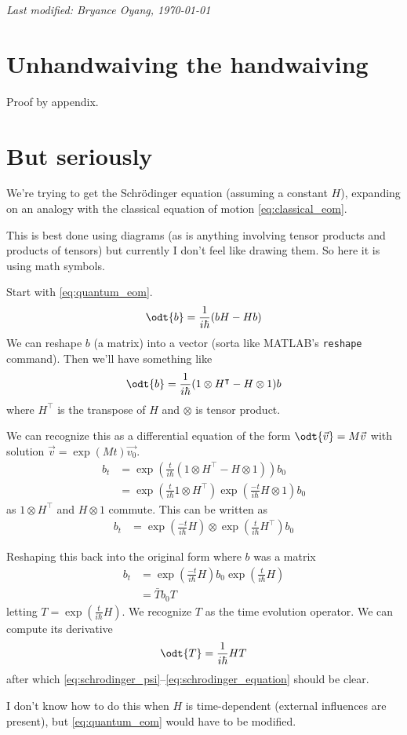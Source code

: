 \documentclass[12pt, oneside, letterpaper, fleqn]{article}
\begin{document}
\hfill \emph{Last modified: Bryance Oyang, \today}

\begin{appendices}
\section{Unhandwaiving the handwaiving}\label{app:complicated}
Proof by appendix.

\section{But seriously}
We're trying to get the Schr\"odinger equation (assuming a constant
$H$), expanding on an analogy with the classical equation of motion
\eqref{eq:classical_eom}.

This is best done using diagrams (as is anything involving tensor
products and products of tensors) but currently I don't feel like
drawing them. So here it is using math symbols.

Start with \eqref{eq:quantum_eom}.
\begin{align*}
\odt{b} = \frac{1}{i\hbar}(bH - Hb)
\end{align*}
We can reshape $b$ (a matrix) into a vector (sorta like MATLAB's
\texttt{reshape} command). Then we'll have something like
\begin{align*}
\odt{b} = \frac{1}{i\hbar}(1\otimes H^\intercal - H\otimes 1)b
\end{align*}
where $H^\intercal$ is the transpose of $H$ and $\otimes$ is tensor product.

We can recognize this as a differential equation of the form
$\odt{\vec{v}} = M\vec{v}$ with solution $\vec{v} = \exp(Mt)\vec{v_0}$.
\begin{align*}
b_t &= \exp\left(\frac{t}{i\hbar}(1\otimes H^\intercal - H\otimes 1)\right)b_0\\
&= \exp\left(\frac{t}{i\hbar}1\otimes H^\intercal\right)
\exp\left(\frac{-t}{i\hbar}H\otimes 1\right)b_0
\end{align*}
as $1\otimes H^\intercal$ and $H\otimes 1$ commute. This can be written as
\begin{align*}
b_t &= \exp\left(\frac{-t}{i\hbar}H\right)
\otimes\exp\left(\frac{t}{i\hbar}H^\intercal\right)b_0
\end{align*}

Reshaping this back into the original form where $b$ was a matrix
\begin{align*}
b_t &= \exp\left(\frac{-t}{i\hbar}H\right) b_0
\exp\left(\frac{t}{i\hbar}H\right)\\
&= \bar{T} b_0 T
\end{align*}
letting $T = \exp\left(\frac{t}{i\hbar}H\right)$. We recognize $T$ as
the time evolution operator. We can compute its derivative
\begin{align*}
\odt{T} = \frac{1}{i\hbar} HT
\end{align*}
after which \eqref{eq:schrodinger_psi}--\eqref{eq:schrodinger_equation}
should be clear.

I don't know how to do this when $H$ is time-dependent
(external influences are present), but \eqref{eq:quantum_eom} would have
to be modified.
\end{appendices}
\end{document}
